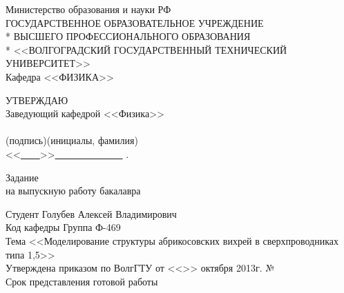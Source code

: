 \begin{titlepage}
	\begin{center}
		Министерство образования и науки РФ \\
		\vspace{.5cm}
		ГОСУДАРСТВЕННОЕ ОБРАЗОВАТЕЛЬНОЕ УЧРЕЖДЕНИЕ\\*
		ВЫСШЕГО ПРОФЕССИОНАЛЬНОГО ОБРАЗОВАНИЯ\\*
		<<ВОЛГОГРАДСКИЙ ГОСУДАРСТВЕННЫЙ ТЕХНИЧЕСКИЙ УНИВЕРСИТЕТ>>\\
		\vspace{.5cm}
		Кафедра <<ФИЗИКА>>
		\vspace{.5cm}
	\end{center}
	\begin{flushright}
		УТВЕРЖДАЮ\\
		Заведующий кафедрой <<Физика>>\\
		\vspace{.3cm}
		\underline{\hspace{2cm}}\hspace{1cm}\underline{\hspace{4cm}}\\
		\vspace{-.2cm}\footnotesize(подпись)\hspace{1.8cm}(инициалы, фамилия)
			\hspace*{.2cm}\ \normalsize\\
		\vspace{.3cm}
		<<\underline{\ \ \ \ }>>\underline{\ \ \ \ \ \ \ \ \ \ \ \ \ \ } 
			\the{}.
	\end{flushright}
	\begin{center}
		\large Задание \\
		\normalsize на выпускную работу бакалавра
	\end{center}
	\begin{flushleft}
		Студент Голубев Алексей Владимирович\\
		Код кафедры \underline{\hspace{3cm}}\hspace{6cm}Группа Ф-469\\
		Тема <<Моделирование структуры абрикосовских вихрей в сверхпроводниках 
		    типа 1,5>>\\
		Утверждена приказом по ВолгГТУ от <<\underline{\hspace{1cm}}>> 
			октября 2013г. №\underline{\hspace{3.5cm}}\\
		Срок представления готовой работы \underline{\hspace{6cm}}\\

\end{flushleft}
\end{titlepage}
